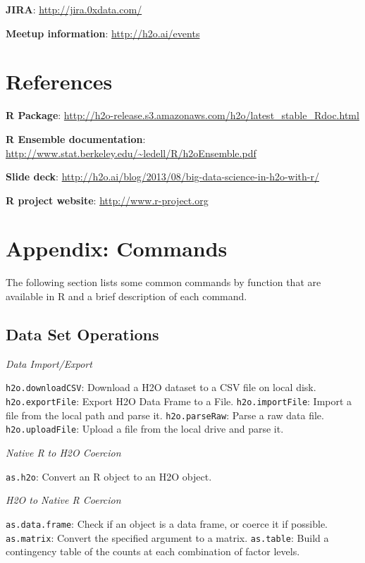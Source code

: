 {\textbf{JIRA}}: {\url{http://jira.0xdata.com/}}

{\textbf{Meetup information}}: {\url{http://h2o.ai/events}}

\section{References}\bigskip

{\bfseries{R Package}}:  \url{http://h2o-release.s3.amazonaws.com/h2o/latest_stable_Rdoc.html}

{\bfseries{R Ensemble documentation}}: \url{http://www.stat.berkeley.edu/~ledell/R/h2oEnsemble.pdf} 

{\bfseries{Slide deck}}: \url{http://h2o.ai/blog/2013/08/big-data-science-in-h2o-with-r/} 

{\bfseries{R project website}}: \url{http://www.r-project.org} 

\newpage
\section{Appendix: Commands} \label{Appendix} 

The following section lists some common commands by function that are available in R and a brief description of each command. 
\subsection {Data Set Operations}
{\emph{Data Import/Export}}\par
{\texttt{h2o.downloadCSV}}: Download a H2O dataset to a CSV file on local disk.\newline
{\texttt{h2o.exportFile}}: Export H2O Data Frame to a File.\newline
{\texttt{h2o.importFile}}: Import a file from the local path and parse it.\newline
{\texttt{h2o.parseRaw}}: Parse a raw data file. \newline
{\texttt{h2o.uploadFile}}: Upload a file from the local drive and parse it.\newline

{\emph{Native R to H2O Coercion}}\par
 {\texttt{as.h2o}}: Convert an R object to an H2O object.\newline


\emph{H2O to Native R Coercion}\par
{\texttt{as.data.frame}}: Check if an object is a data frame, or coerce it if possible.\newline
{\texttt{as.matrix}}: Convert the specified argument to a matrix.\newline %
 {\texttt{as.table}}: Build a contingency table of the counts at each combination of factor levels.\newline%

